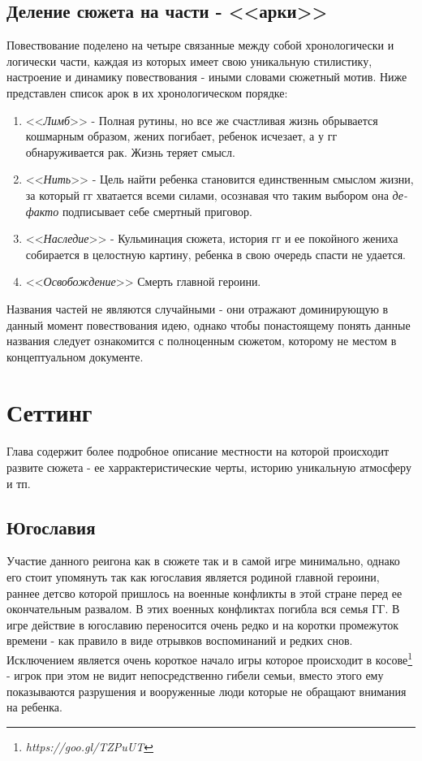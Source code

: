 \documentclass[11pt]{report}
\begin{document}
\section{Деление сюжета на части - <<арки>>}
Повествование поделено на четыре связанные между собой хронологически  и логически части, каждая из которых имеет свою уникальную стилистику, настроение и динамику повествования - иными словами сюжетный мотив. Ниже представлен список арок в их хронологическом порядке:
\begin{enumerate}
\item <<\textit{Лимб}>> - Полная рутины, но все же счастливая жизнь обрывается кошмарным образом, жених погибает, ребенок исчезает, а у гг обнаруживается рак. Жизнь теряет смысл.
\item <<\textit{Нить}>> - Цель найти ребенка становится единственным смыслом жизни, за который гг хватается всеми силами, осознавая что таким выбором она \textit{де-факто} подписывает себе смертный приговор.
\item <<\textit{Наследие}>> - Кульминация сюжета, история гг и ее покойного жениха собирается в целостную картину, ребенка в свою очередь спасти не удается.
\item <<\textit{Освобождение}>> Смерть главной героини.
\end{enumerate}
Названия частей не являются случайными - они отражают доминирующую в данный момент повествования идею, однако чтобы понастоящему понять данные названия следует ознакомится с полноценным сюжетом, которому не местом в концептуальном документе.


\chapter{Сеттинг}
Глава содержит более подробное описание местности на которой происходит развите сюжета - ее харрактеристические черты, историю уникальную атмосферу и тп.

\newpage
\section{Югославия}

Участие данного реигона как в сюжете так и в самой игре минимально, однако его стоит упомянуть так как югославия является родиной главной героини, раннее детсво которой пришлось на военные конфликты в этой стране перед ее окончательным развалом. В этих военных конфликтах погибла вся семья ГГ. В игре действие в югославию переносится очень редко и на коротки промежуток времени -  как правило в виде отрывков воспоминаний и редких снов. Исключением является очень короткое начало игры которое происходит в косове\footnote{\emph{https://goo.gl/TZPuUT}} - игрок при этом не видит непосредственно гибели семьи, вместо этого ему показываются разрушения и вооруженные люди которые не обращают внимания на ребенка.
\end{document}
